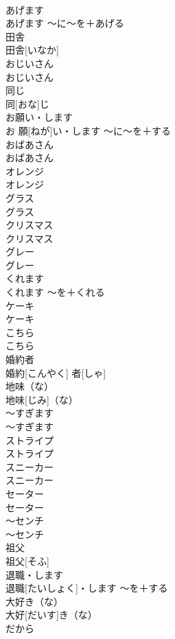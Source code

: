 \documentclass[8pt]{extreport}
\begin{document}
\begin{CJK}{UTF8}{min}
\\	あげます	
\\	あげます	〜に〜を＋あげる	
\\	田舎	
\\	田舎[いなか]		
\\	おじいさん	
\\	おじいさん		
\\	同じ	
\\	同[おな]じ		
\\	お願い・します	
\\	お 願[ねが]い・します	〜に〜を＋する	
\\	おばあさん	
\\	おばあさん		
\\	オレンジ	
\\	オレンジ		
\\	グラス	
\\	グラス		
\\	クリスマス	
\\	クリスマス		
\\	グレー	
\\	グレー		
\\	くれます	
\\	くれます	〜を＋くれる	
\\	ケーキ	
\\	ケーキ		
\\	こちら	
\\	こちら		
\\	婚約者	
\\	婚約[こんやく] 者[しゃ]		
\\	地味（な）	
\\	地味[じみ]（な）		
\\	〜すぎます	
\\	〜すぎます		
\\	ストライプ	
\\	ストライプ		
\\	スニーカー	
\\	スニーカー		
\\	セーター	
\\	セーター		
\\	〜センチ	
\\	〜センチ		
\\	祖父	
\\	祖父[そふ]		
\\	退職・します	
\\	退職[たいしょく]・します	〜を＋する	
\\	大好き（な）	
\\	大好[だいす]き（な）		
\\	だから	

\end{CJK}
\end{document}

